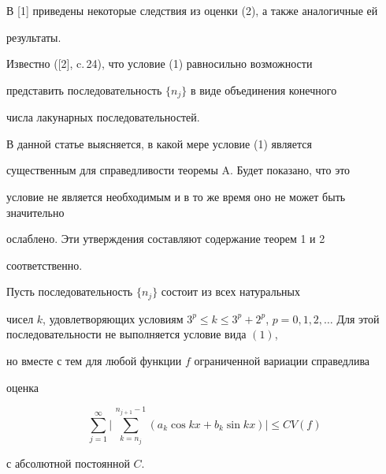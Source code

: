 \medskip





В [1] приведены некоторые следствия из оценки (2), а также аналогичные ей


результаты.


Известно ([2], c.\,24), что условие (1) равносильно возможности


представить последовательность $\{ n_j \}$ в виде объединения конечного


числа лакунарных последовательностей.


В данной статье выясняется, в какой мере условие (1) является


существенным для справедливости теоремы A. Будет показано, что это


условие не является необходимым и в то же время оно не может быть значительно


ослаблено. Эти утверждения составляют содержание теорем 1 и 2


соответственно.





\begin{thm}


Пусть последовательность $\{ n_j \}$ состоит из всех натуральных


чисел $k$, удовлетворяющих условиям $3^p \le k \le 3^p + 2^p$, $p=0, 1, 2,


\dotsc$ Для этой последовательности не выполняется условие вида $(1)$,


но вместе с тем для любой функции $f$ ограниченной вариации справедлива


оценка


\begin{equation}


\sum_{j = 1}^{\infty} \bigg | \, \sum_{k = n_j}^{n_{j + 1} - 1}


( a_k \cos kx + b_k \sin kx ) \bigg | \le C V(f)


\end{equation}


с абсолютной постоянной $C$.


\end{thm}





